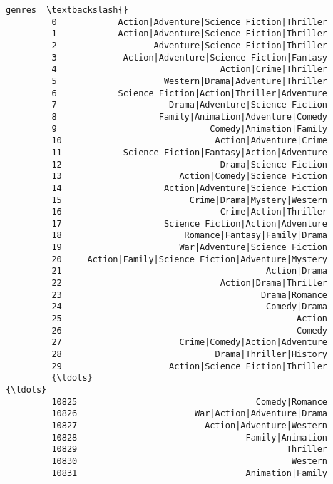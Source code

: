 \documentclass[11pt]{article}
\begin{document}
\begin{Verbatim}[commandchars=\\\{\}]
                                                         genres  \textbackslash{}
         0            Action|Adventure|Science Fiction|Thriller   
         1            Action|Adventure|Science Fiction|Thriller   
         2                   Adventure|Science Fiction|Thriller   
         3             Action|Adventure|Science Fiction|Fantasy   
         4                                Action|Crime|Thriller   
         5                     Western|Drama|Adventure|Thriller   
         6            Science Fiction|Action|Thriller|Adventure   
         7                      Drama|Adventure|Science Fiction   
         8                    Family|Animation|Adventure|Comedy   
         9                              Comedy|Animation|Family   
         10                              Action|Adventure|Crime   
         11            Science Fiction|Fantasy|Action|Adventure   
         12                               Drama|Science Fiction   
         13                       Action|Comedy|Science Fiction   
         14                    Action|Adventure|Science Fiction   
         15                         Crime|Drama|Mystery|Western   
         16                               Crime|Action|Thriller   
         17                    Science Fiction|Action|Adventure   
         18                        Romance|Fantasy|Family|Drama   
         19                       War|Adventure|Science Fiction   
         20     Action|Family|Science Fiction|Adventure|Mystery   
         21                                        Action|Drama   
         22                               Action|Drama|Thriller   
         23                                       Drama|Romance   
         24                                        Comedy|Drama   
         25                                              Action   
         26                                              Comedy   
         27                       Crime|Comedy|Action|Adventure   
         28                              Drama|Thriller|History   
         29                     Action|Science Fiction|Thriller   
         {\ldots}                                                {\ldots}   
         10825                                   Comedy|Romance   
         10826                       War|Action|Adventure|Drama   
         10827                         Action|Adventure|Western   
         10828                                 Family|Animation   
         10829                                         Thriller   
         10830                                          Western   
         10831                                 Animation|Family   

\end{Verbatim}
\end{document}
